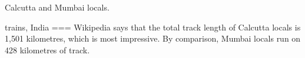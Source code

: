 Calcutta and Mumbai locals.

trains, India
===
Wikipedia says that the total track length of Calcutta locals is 1,501 kilometres, which is most impressive. By comparison, Mumbai locals run on 428 kilometres of track.

\nocite{2025} \nocite{2025a}